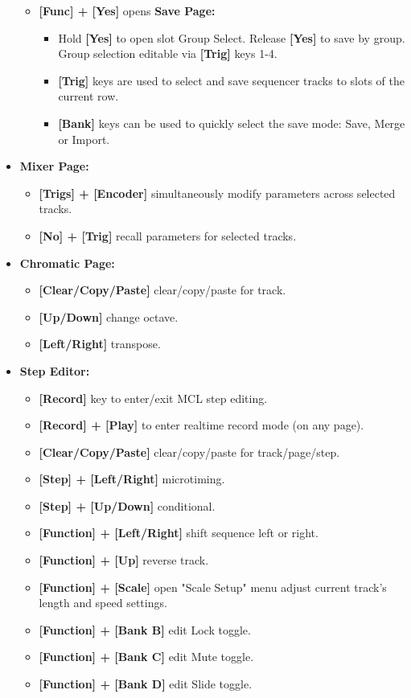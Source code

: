 \begin{itemize}
\begin{itemize}
\item \textbf{[Func] + [Yes]} opens \textbf{Save Page:}
    \begin{itemize}
    \item Hold \textbf{[Yes]} to open slot Group Select. Release \textbf{[Yes]} to save by group.  Group selection editable via \textbf{[Trig]} keys 1-4.
    \item \textbf{[Trig]} keys are used to select and save sequencer tracks to slots of the current row.
    \item \textbf{[Bank]} keys can be used to quickly select the save mode: Save, Merge or Import.
    \end{itemize}
\end{itemize}

\item \textbf{Mixer Page:}
      \begin{itemize}
       \item \textbf{[Trigs] + [Encoder]} simultaneously modify parameters across selected tracks. 
      \item \textbf{[No] + [Trig]} recall parameters for selected tracks.
       \end{itemize}
\newpage
\item \textbf{Chromatic Page:}
      \begin{itemize}
      \item \textbf{[Clear/Copy/Paste]} clear/copy/paste for track.
      \item \textbf{[Up/Down]} change octave.
      \item \textbf{[Left/Right]} transpose.
      \end{itemize}

\item \textbf{Step Editor:}
\begin{itemize}
      \item \textbf{[Record]} key to enter/exit MCL step editing.
      \item \textbf{[Record] + [Play]} to enter realtime record mode (on any page).
      \item \textbf{[Clear/Copy/Paste]} clear/copy/paste for track/page/step.
      \item \textbf{[Step] + [Left/Right]} microtiming.
      \item \textbf{[Step] + [Up/Down]} conditional.
      \item \textbf{[Function] + [Left/Right]} shift sequence left or right.
      \item \textbf{[Function] + [Up]} reverse track.
      \item \textbf{[Function] + [Scale]} open "Scale Setup" menu adjust current track's length and speed settings.
      \item \textbf{[Function] + [Bank B]} edit Lock toggle.
      \item \textbf{[Function] + [Bank C]} edit Mute toggle.
      \item \textbf{[Function] + [Bank D]} edit Slide toggle.
\end{itemize}


\end{itemize}
